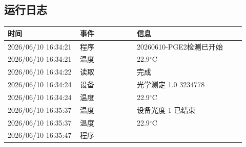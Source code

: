 \documentclass[UTF8,10pt,a4paper,fontset=fandol]{ctexart}
\newcommand{\fieldvalue}[1]{#1}
\begin{document}
\subsection*{运行日志}

\small
\begin{tabular}{@{}p{0.28\linewidth}p{0.22\linewidth}p{0.42\linewidth}@{}}
\textbf{时间} & \textbf{事件} & \textbf{信息} \\ \hline
\fieldvalue{2026/06/10 16:34:21}
&
\fieldvalue{程序}
&
\fieldvalue{20260610-PGE2检测已开始}
\\
\fieldvalue{2026/06/10 16:34:21}
&
\fieldvalue{温度}
&
\fieldvalue{22.9$^\circ$C}
\\
\fieldvalue{2026/06/10 16:34:22}
&
\fieldvalue{读取}
&
\fieldvalue{完成}
\\
\fieldvalue{2026/06/10 16:34:24}
&
\fieldvalue{设备}
&
\fieldvalue{光学测定 1.0 3234778}
\\
\fieldvalue{2026/06/10 16:34:24}
&
\fieldvalue{温度}
&
\fieldvalue{22.9$^\circ$C}
\\
\fieldvalue{2026/06/10 16:35:37}
&
\fieldvalue{温度}
&
\fieldvalue{设备光度 1 已结束}
\\
\fieldvalue{2026/06/10 16:35:37}
&
\fieldvalue{温度}
&
\fieldvalue{22.9$^\circ$C}
\\
\fieldvalue{2026/06/10 16:35:47}
&
\fieldvalue{程序}
&
\\
\end{tabular}
\normalsize
\end{document}
